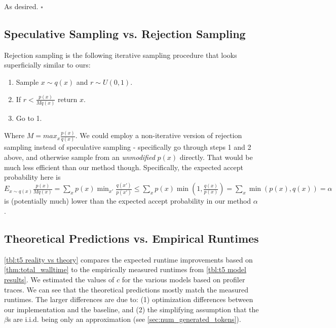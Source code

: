 \documentclass[nohyperref]{article}
\theoremstyle{plain}
\theoremstyle{definition}
\theoremstyle{remark}
\begin{document}
As desired. $\square$

\subsection{Speculative Sampling vs. Rejection Sampling}
\label{sec:vs_rejection_sampling}
Rejection sampling is the following iterative sampling procedure that looks superficially similar to ours:

\begin{enumerate}
    \item Sample $x \sim q(x)$ and $r \sim U(0,1)$.
    \item If $r < \frac{p(x)}{Mq(x)}$ return $x$.
    \item Go to 1.
\end{enumerate}

Where $M = max_{x}\frac{p(x)}{q(x)}$. We could employ a non-iterative version of rejection sampling instead of speculative sampling - specifically go through steps 1 and 2 above, and otherwise sample from an \emph{unmodified} $p(x)$ directly. That would be much less efficient than our method though. Specifically, the expected accept probability here is $E_{x \sim q(x)}\frac{p(x)}{Mq(x)} = \sum_{x}p(x)\min_{x'}\frac{q(x')}{p(x')} \le \sum_{x}p(x)\min(1, \frac{q(x)}{p(x)}) = \sum_{x}\min(p(x), q(x)) = \alpha$ is (potentially much) lower than the expected accept probability in our method $\alpha$.


\subsection{Theoretical Predictions vs. Empirical Runtimes}
\label{sec:theory_vs_emp}

\cref{tbl:t5 reality vs theory} compares the expected runtime improvements based on \cref{thm:total_walltime} to the empirically measured runtimes from \cref{tbl:t5 model results}.
We estimated the values of $c$ for the various models based on profiler traces.
We can see that the theoretical predictions mostly match the measured runtimes.
The larger differences are due to: (1) optimization differences between our implementation and the baseline, and (2) the simplifying assumption that the $\beta$s are i.i.d. being only an approximation (see \cref{sec:num_generated_tokens}).
\end{document}
